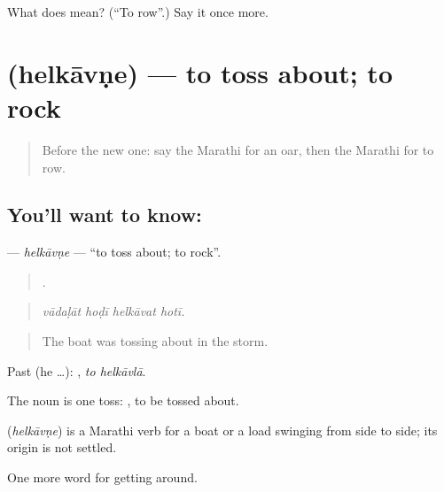 \begin{tcolorbox}[breakable,colback=teal!4,colframe=teal!35!black,title={Before you move on}]
What does  mean? (\textquotedblleft{}To row\textquotedblright{}.) Say it once more.
\end{tcolorbox}
\section[\texorpdfstring{\mr{हेलकावणे} (helkāvṇe)}{हेलकावणे (helkāvṇe)}]{ (helkāvṇe) — to toss about; to rock}

\label{lesson:MR-C408-helkavne}



\begin{quote}
Before the new one: say the Marathi for an oar, then the Marathi for to row.
\end{quote}

\subsection*{You'll want to know: }
\textbf{} — \emph{helkāvṇe} — \textquotedblleft{}to toss about; to rock\textquotedblright{}.

\begin{quote}
   .
\end{quote}

\begin{quote}
\emph{vādaḷāt hoḍī helkāvat hotī.}
\end{quote}

\begin{quote}
The boat was tossing about in the storm.
\end{quote}

Past (he …):  , \emph{to helkāvlā}.

The noun  is one toss:  , to be tossed about.

\begin{cousinweb}
\textbf{} (\emph{helkāvṇe}) is a Marathi verb for a boat or a load swinging from side to side; its origin is not settled.
\end{cousinweb}

\begin{grammarlens}[title={What you've built}]
One more word for getting around.
\end{grammarlens}


